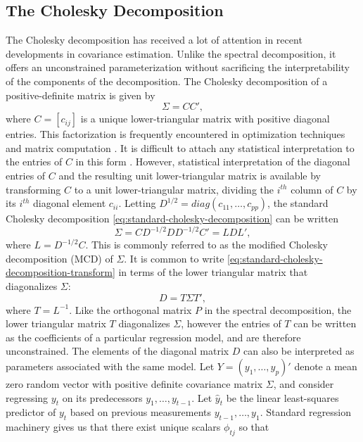 \subsection{The Cholesky Decomposition} \label{chapter-1-cholesky-decomposition}

The Cholesky decomposition has received a lot of attention in recent developments in covariance estimation. Unlike the spectral decomposition, it offers an unconstrained parameterization without sacrificing the interpretability of the components of the decomposition. The Cholesky decomposition of a positive-definite matrix is given by
\begin{equation}\label{eq:standard-cholesky-decomposition}
\Sigma = CC',
\end{equation}
\noindent
where $C = \left[c_{ij} \right]$ is a unique lower-triangular matrix with positive diagonal entries. This factorization is frequently encountered in optimization techniques and matrix computation \citep{golub2012matrix}. It is difficult to attach any statistical interpretation to the entries of $C$ in this form \citep{pinheiro1996unconstrained}. However, statistical interpretation of the diagonal entries of $C$ and the resulting unit lower-triangular matrix is available by transforming $C$ to a unit lower-triangular matrix, dividing the $i^{th}$ column of $C$ by its $i^{th}$ diagonal element $c_{ii}$. Letting $D^{1/2} = diag\left( c_{11},\dots, c_{pp} \right)$, the standard Cholesky decomposition \eqref{eq:standard-cholesky-decomposition} can be written
\begin{equation}\label{eq:standard-cholesky-decomposition-transform}
\Sigma = CD^{-1/2}DD^{-1/2}C' = L D L',
\end{equation}
\noindent
where $L = D^{-1/2}C$. This is commonly referred to as the modified Cholesky decomposition (MCD) of $\Sigma$. It is common to write \eqref{eq:standard-cholesky-decomposition-transform} in terms of the lower triangular matrix that diagonalizes $\Sigma$:
\begin{equation}\label{eq:modified-cholesky-decomposition}
D = T\Sigma T',
\end{equation}
 \noindent
where $T = L^{-1}$. Like the orthogonal matrix $P$ in the spectral decomposition, the lower triangular matrix $T$ diagonalizes $\Sigma$, however the entries of $T$ can be written as the coefficients of a particular regression model, and are therefore unconstrained. The elements of the diagonal matrix $D$ can also be interpreted as parameters associated with the same model. Let $Y = \left( y_1,\dots, y_p \right)'$ denote a mean zero random vector with positive definite covariance matrix $\Sigma$, and consider regressing $y_t$ on its predecessors $y_1, \dots, y_{t-1}$. Let $\hat{y}_t$ be the linear least-squares predictor of $y_t$ based on previous measurements $y_{t-1}, \dots , y_1$. Standard regression machinery gives us that there exist unique scalars $\phi_{tj}$ so that
